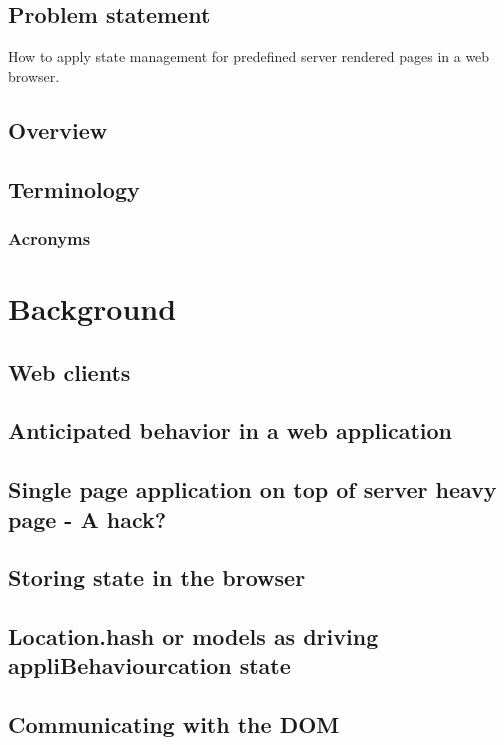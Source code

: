 \documentclass[english]{ifimaster}
\begin{document}
\section{Problem statement}
How to apply state management for predefined server rendered pages in a web browser.
\section{Overview}
\section{Terminology}
\subsection{Acronyms}


\chapter{Background}

\section{Web clients}

\section{Anticipated behavior in a web application}

\section{Single page application on top of server heavy page - A hack?}

\section{Storing state in the browser}

\section{Location.hash or models as driving appliBehaviourcation state}

\section{Communicating with the DOM}
\end{document}
